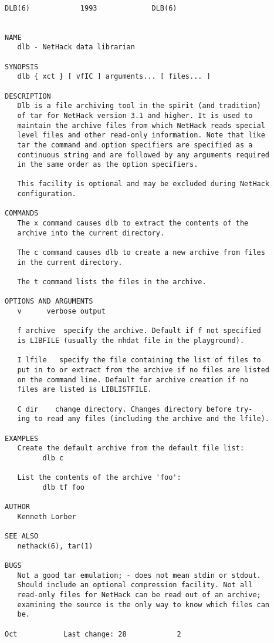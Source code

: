 \documentclass[11pt]{article}
\begin{document}
\begin{verbatim}

DLB(6)            1993             DLB(6)


NAME
   dlb - NetHack data librarian

SYNOPSIS
   dlb { xct } [ vfIC ] arguments... [ files... ]

DESCRIPTION
   Dlb is a file archiving tool in the spirit (and tradition)
   of tar for NetHack version 3.1 and higher. It is used to
   maintain the archive files from which NetHack reads special
   level files and other read-only information. Note that like
   tar the command and option specifiers are specified as a
   continuous string and are followed by any arguments required
   in the same order as the option specifiers.

   This facility is optional and may be excluded during NetHack
   configuration.

COMMANDS
   The x command causes dlb to extract the contents of the
   archive into the current directory.

   The c command causes dlb to create a new archive from files
   in the current directory.

   The t command lists the files in the archive.

OPTIONS AND ARGUMENTS
   v      verbose output

   f archive  specify the archive. Default if f not specified
   is LIBFILE (usually the nhdat file in the playground).

   I lfile   specify the file containing the list of files to
   put in to or extract from the archive if no files are listed
   on the command line. Default for archive creation if no
   files are listed is LIBLISTFILE.

   C dir    change directory. Changes directory before try-
   ing to read any files (including the archive and the lfile).

EXAMPLES
   Create the default archive from the default file list:
         dlb c

   List the contents of the archive 'foo':
         dlb tf foo

AUTHOR
   Kenneth Lorber

SEE ALSO
   nethack(6), tar(1)

BUGS
   Not a good tar emulation; - does not mean stdin or stdout.
   Should include an optional compression facility. Not all
   read-only files for NetHack can be read out of an archive;
   examining the source is the only way to know which files can
   be.

Oct           Last change: 28            2

\end{verbatim}
\end{document}
